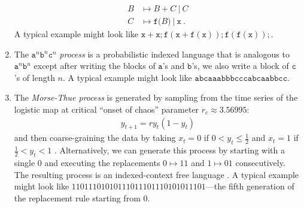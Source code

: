 \documentclass[draft,aps,pre,twocolumn,groupaddress,showkeys,nofootinbib,preprintnumbers,floatfix]{revtex4-2}
\begin{document}
\begin{enumerate}
\begin{align*}
    B &\mapsto B\ \mathtt{+}\ C\ |\ C\\
    C &\mapsto \mathtt{f(}B\mathtt{)}\ |\ \mathtt{x}
  ~.
\end{align*}
	A typical example might look like $\mathtt{x+x;f(x+f(x));f(f(x));}$.
\item The $\mathtt{a}^n \mathtt{b}^n \mathtt{c}^n$ \emph{process} is a
	probabilistic indexed language \cite{Hopc06a} that is analogous to
	$\mathtt{a}^n \mathtt{b}^n$ except after writing the blocks of
	$\mathtt{a}$'s and $\mathtt{b}$'s, we also write a block of $\mathtt{c}$'s
	of length $n$. A typical example might look like
	$\mathtt{abcaaabbbcccabcaabbcc}$.
\item The \emph{Morse-Thue process} is generated by sampling from the time
	series of the logistic map at critical ``onset of chaos'' parameter
	$r_c \approx 3.56995$:
\begin{align*}
    y_{t+1} = r y_t(1-y_t)
\end{align*}
	and then coarse-graining the data by taking $x_t = 0$ if $0< y_t \leq
	\frac{1}{2}$ and $x_t = 1$ if $\frac{1}{2} < y_t <1$ \cite{Kurk03a}.
	Alternatively, we can generate this process by starting with a single $0$
	and executing the replacements $0 \mapsto 11$ and $1 \mapsto 01$
	consecutively. The resulting process is an indexed-context free language
	\cite{Crut92c}. A typical example might look like
	$11011101010111011101110101011101$---the fifth generation of the
	replacement rule starting from $0$.
\end{enumerate}
\end{document}
